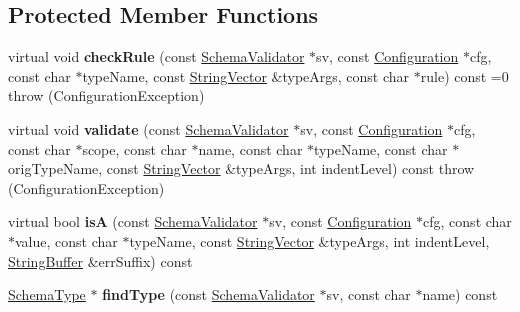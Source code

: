 \subsection*{Protected Member Functions}
\begin{DoxyCompactItemize}
\item 
\hypertarget{classCONFIG4CPP__NAMESPACE_1_1SchemaType_a7951ab8f525833bc06272820f69733ea}{virtual void {\bfseries check\-Rule} (const \hyperlink{classCONFIG4CPP__NAMESPACE_1_1SchemaValidator}{Schema\-Validator} $\ast$sv, const \hyperlink{classCONFIG4CPP__NAMESPACE_1_1Configuration}{Configuration} $\ast$cfg, const char $\ast$type\-Name, const \hyperlink{classCONFIG4CPP__NAMESPACE_1_1StringVector}{String\-Vector} \&type\-Args, const char $\ast$rule) const =0  throw (\-Configuration\-Exception)}\label{classCONFIG4CPP__NAMESPACE_1_1SchemaType_a7951ab8f525833bc06272820f69733ea}

\item 
\hypertarget{classCONFIG4CPP__NAMESPACE_1_1SchemaType_a694211a9a083ac45039dbe888c8ada6e}{virtual void {\bfseries validate} (const \hyperlink{classCONFIG4CPP__NAMESPACE_1_1SchemaValidator}{Schema\-Validator} $\ast$sv, const \hyperlink{classCONFIG4CPP__NAMESPACE_1_1Configuration}{Configuration} $\ast$cfg, const char $\ast$scope, const char $\ast$name, const char $\ast$type\-Name, const char $\ast$orig\-Type\-Name, const \hyperlink{classCONFIG4CPP__NAMESPACE_1_1StringVector}{String\-Vector} \&type\-Args, int indent\-Level) const   throw (\-Configuration\-Exception)}\label{classCONFIG4CPP__NAMESPACE_1_1SchemaType_a694211a9a083ac45039dbe888c8ada6e}

\item 
\hypertarget{classCONFIG4CPP__NAMESPACE_1_1SchemaType_ac2dcd5eb5d90d17f9b24ecd67758f79b}{virtual bool {\bfseries is\-A} (const \hyperlink{classCONFIG4CPP__NAMESPACE_1_1SchemaValidator}{Schema\-Validator} $\ast$sv, const \hyperlink{classCONFIG4CPP__NAMESPACE_1_1Configuration}{Configuration} $\ast$cfg, const char $\ast$value, const char $\ast$type\-Name, const \hyperlink{classCONFIG4CPP__NAMESPACE_1_1StringVector}{String\-Vector} \&type\-Args, int indent\-Level, \hyperlink{classCONFIG4CPP__NAMESPACE_1_1StringBuffer}{String\-Buffer} \&err\-Suffix) const }\label{classCONFIG4CPP__NAMESPACE_1_1SchemaType_ac2dcd5eb5d90d17f9b24ecd67758f79b}

\item 
\hypertarget{classCONFIG4CPP__NAMESPACE_1_1SchemaType_a7417b9c4739c2e02a3df352bdaf52add}{\hyperlink{classCONFIG4CPP__NAMESPACE_1_1SchemaType}{Schema\-Type} $\ast$ {\bfseries find\-Type} (const \hyperlink{classCONFIG4CPP__NAMESPACE_1_1SchemaValidator}{Schema\-Validator} $\ast$sv, const char $\ast$name) const }\label{classCONFIG4CPP__NAMESPACE_1_1SchemaType_a7417b9c4739c2e02a3df352bdaf52add}


\end{DoxyCompactItemize}
